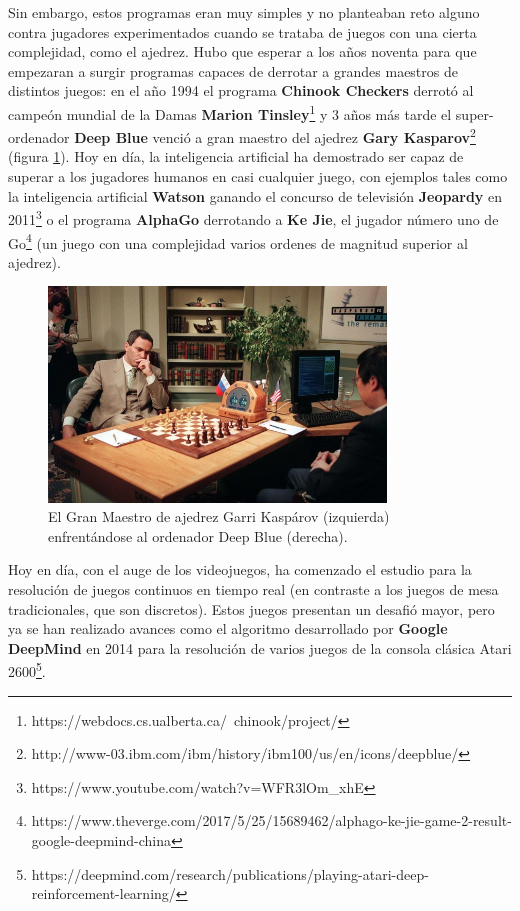 Sin embargo, estos programas eran muy simples y no planteaban reto alguno contra jugadores experimentados cuando se trataba de juegos con una cierta complejidad, como el ajedrez. Hubo que esperar a los años noventa para que empezaran a surgir programas capaces de derrotar a grandes maestros de distintos juegos: en el año 1994 el programa \textbf{Chinook Checkers} derrotó al campeón mundial de la Damas \textbf{Marion Tinsley}\footnote{https://webdocs.cs.ualberta.ca/~chinook/project/} y 3 años más tarde el super-ordenador \textbf{Deep Blue} venció a gran maestro del ajedrez \textbf{Gary Kasparov}\footnote{http://www-03.ibm.com/ibm/history/ibm100/us/en/icons/deepblue/} (figura \ref{deepblue-vs-kasparov}). Hoy en día, la inteligencia artificial ha demostrado ser capaz de superar a los jugadores humanos en casi cualquier juego, con ejemplos tales como la inteligencia artificial \textbf{Watson} ganando el concurso de televisión \textbf{Jeopardy} en 2011\footnote{https://www.youtube.com/watch?v=WFR3lOm\_xhE} o el programa \textbf{AlphaGo} derrotando a \textbf{Ke Jie}, el jugador número uno de Go\footnote{https://www.theverge.com/2017/5/25/15689462/alphago-ke-jie-game-2-result-google-deepmind-china} (un juego con una complejidad varios ordenes de magnitud superior al ajedrez).

\begin{figure}[h]
	\includegraphics[width=0.8\textwidth]{images/estadodelarte/ai/deepblue-vs-kasparov}
	\centering
	\caption{El Gran Maestro de ajedrez Garri Kaspárov (izquierda) enfrentándose al ordenador Deep Blue (derecha).}
	\label{deepblue-vs-kasparov}
\end{figure}

Hoy en día, con el auge de los videojuegos, ha comenzado el estudio para la resolución de juegos continuos en tiempo real (en contraste a los juegos de mesa tradicionales, que son discretos). Estos juegos presentan un desafió mayor, pero ya se han realizado avances como el algoritmo desarrollado por \textbf{Google DeepMind} en 2014 para la resolución de varios juegos de la consola clásica Atari 2600\footnote{https://deepmind.com/research/publications/playing-atari-deep-reinforcement-learning/}.

